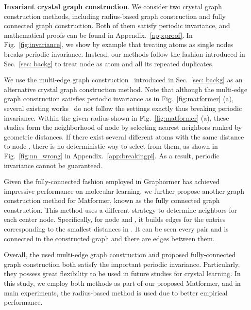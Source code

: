\documentclass{article}
\begin{document}
\textbf{Invariant crystal graph construction}. We consider two crystal graph construction methods, including radius-based graph construction and fully connected graph construction. Both of them satisfy periodic invariance, and mathematical proofs can be found in Appendix.~\ref{app:proof}. 
In Fig.~\ref{fig:invariance},
we show by example that treating atoms as single nodes breaks periodic invariance.
Instead, our methods follow the fashion introduced in
Sec.~\ref{sec: backg} to treat node  as atom  and all its repeated duplicates.


We use the multi-edge graph construction~\citep{cgcnn} introduced in Sec.~\ref{sec: backg} as an alternative crystal graph construction method.
Note that although the multi-edge graph construction satisfies periodic invariance as in Fig.~\ref{fig:matformer} (a), several existing works~\citep{cgcnn,gatgnn} do not follow the settings exactly
thus breaking periodic invariance. 
Within the given radius shown in Fig.~\ref{fig:matformer} (a),
these studies form the neighborhood of node  by selecting  nearest neighbors ranked by geometric distances. If there exist several different atoms with the same distance to node , there is no deterministic way to select from them, as shown in Fig.~\ref{fig:nn_wrong} in Appendix.~\ref{app:breakingpi}. 
As a result, periodic invariance cannot be guaranteed.



Given the fully-connected fashion employed in Graphormer has achieved impressive performance on molecular learning,
we further propose another graph construction method for Matformer, known as 
the fully connected graph construction. This method uses a different strategy to
determine neighbors for each center node.
Specifically, for node  and , it builds edges for the entries corresponding to the  smallest distances in . It can be seen every pair  and  is connected in the constructed graph and there are  edges between them.


Overall, the used multi-edge graph construction and proposed fully-connected graph construction
both satisfy the important periodic invariance.
Particularly, they possess great flexibility to 
be used in future studies for crystal learning.
In this study, we employ both methods as part of our proposed
Matformer, and in main experiments, the radius-based method is used due to better empirical performance.
\end{document}
